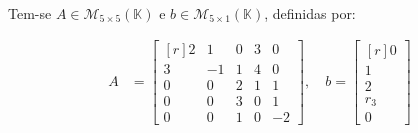 \grupo{}

\paragraph{} Tem-se $A \in \mathcal{M}_{5 \times 5}(\mathbb{K})$ e
$b \in \mathcal{M}_{5 \times 1}(\mathbb{K})$, definidas por:

\begin{align*}
	A &=
	\begin{bmatrix*}[r]
		2 & 1 & 0 & 3 & 0\\
		3 & -1 & 1 & 4 & 0\\
		0 & 0 & 2 & 1 & 1\\
		0 & 0 & 3 & 0 & 1\\
		0 & 0 & 1 & 0 & -2
	\end{bmatrix*},
	\quad
	b =
	\begin{bmatrix*}[r]
		0\\
		1\\
		2\\
		r_3\\
		0
	\end{bmatrix*}
\end{align*}


